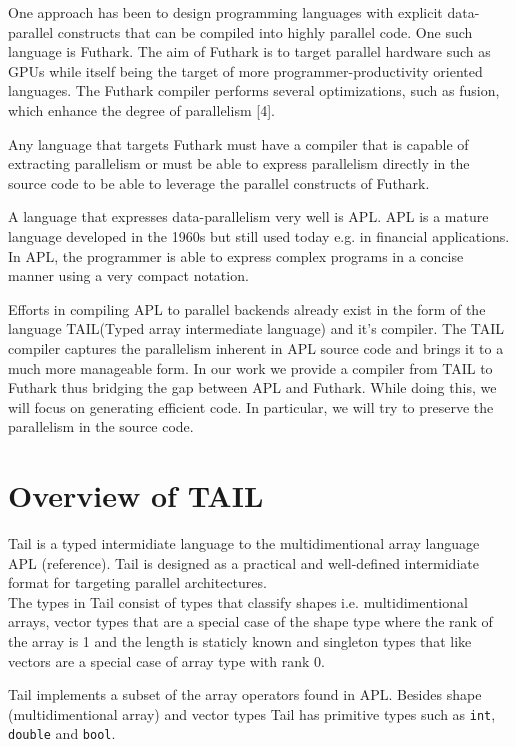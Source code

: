 \documentclass[11pt]{article}
\begin{document}
One approach has been to design programming languages with explicit data-parallel constructs that can be compiled into highly parallel code. One such language is Futhark. The aim of Futhark is to target parallel hardware such as GPUs while itself being the target of more programmer-productivity oriented languages. The Futhark compiler performs several optimizations, such as fusion, which enhance the degree of parallelism [4].

Any language that targets Futhark must have a compiler that is capable of extracting parallelism or must be able to express parallelism directly in the source code to be able to leverage the parallel constructs of Futhark.

A language that expresses data-parallelism very well is APL. APL is a mature language developed in the 1960s but still used today e.g. in financial applications. In APL, the programmer is able to express complex programs in a concise manner using a very compact notation.

Efforts in compiling APL to parallel backends already exist in the form of the language TAIL(Typed array intermediate language) and it’s compiler. The TAIL compiler captures the parallelism inherent in APL source code and brings it to a much more manageable form. In our work we provide a compiler from TAIL to Futhark thus bridging the gap between APL and Futhark. While doing  this, we will focus on generating efficient code. In particular, we will try to preserve the parallelism in the source code.



\section{Overview of TAIL}
Tail is a typed intermidiate language to the multidimentional array language APL (reference). Tail is designed as a practical and well-defined intermidiate format for targeting parallel architectures.\\ 

The types in Tail consist of types that classify shapes i.e. multidimentional arrays, vector types that are a special case of the shape type where the rank of the array is 1 and the length is staticly known and singleton types that like vectors are a special case of array type with rank 0. 

Tail implements a subset of the array operators found in APL.
Besides shape (multidimentional array) and vector types Tail has primitive types such as \verb|int|, \verb|double| and \verb|bool|.
\end{document}
